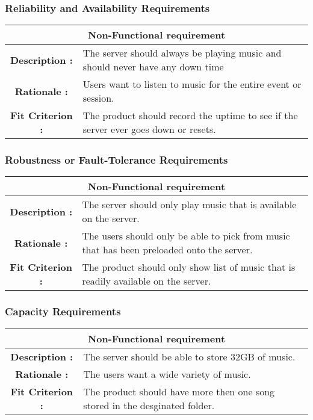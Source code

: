 \documentclass[12pt, titlepage]{article}
\begin{document}
\subsubsection{Reliability and Availability Requirements}
\begin{center}
\begin{table}[H]
\begin{tabularx}{\textwidth}{| c X |}
\hline
\multicolumn{2}{|c|}{\textbf{Non-Functional requirement}}\\
\hline
\textbf{Description : } &  The server should always be playing music and should never have any down time \\
\hline
\textbf{Rationale : } & Users want to listen to music for the entire event or session. \\
\hline
\textbf{Fit Criterion : } & The product should record the uptime to see if the server ever goes down or resets. \\
\hline
\end{tabularx}
\end{table}
\end{center}
\subsubsection{Robustness or Fault-Tolerance Requirements}
\begin{center}
\begin{table}[H]
\begin{tabularx}{\textwidth}{| c X |}
\hline
\multicolumn{2}{|c|}{\textbf{Non-Functional requirement}}\\
\hline
\textbf{Description : } & The server should only play music that is available on the server.\\
\hline
\textbf{Rationale : } & The users should only be able to pick from music that has been preloaded onto the server. \\
\hline
\textbf{Fit Criterion : } & The product should only show list of music that is readily available on the server. \\
\hline
\end{tabularx}
\end{table}
\end{center}
\subsubsection{Capacity Requirements}
\begin{center}
\begin{table}[H]
\begin{tabularx}{\textwidth}{| c X |}
\hline
\multicolumn{2}{|c|}{\textbf{Non-Functional requirement}}\\
\hline
\textbf{Description : } & The server should be able to store 32GB of music.\\
\hline
\textbf{Rationale : } & The users want a wide variety of music. \\
\hline
\textbf{Fit Criterion : } & The product should have more then one song stored in the desginated folder. \\
\hline
\end{tabularx}
\end{table}
\end{center}
\end{document}

